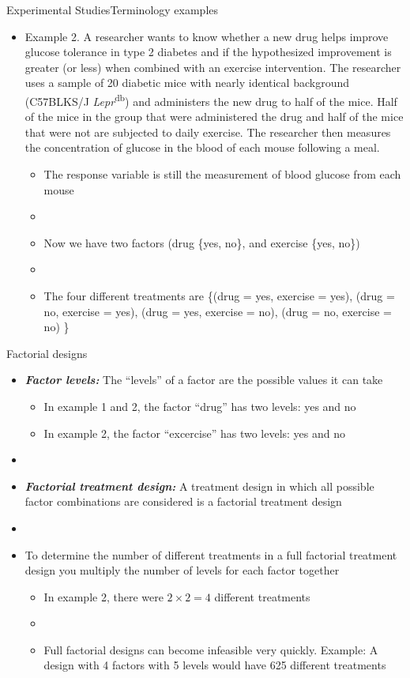 \documentclass[xcolor=dvipsnames]{beamer}
\begin{document}
\begin{frame}{Experimental Studies}{Terminology examples}
\begin{itemize}
	\item Example 2. A researcher wants to know whether a new drug helps improve glucose tolerance in type 2 diabetes and if the hypothesized improvement is greater (or less) when combined with an exercise intervention. The researcher uses a sample of 20 diabetic mice with nearly identical background (C57BLKS/J \emph{Lepr}\textsuperscript{db}) and administers the new drug to half of the mice. Half of the mice in the group that were administered the drug and half of the mice that were not are subjected to daily exercise. The researcher then measures the concentration of glucose in the blood of each mouse following a meal. 
	\begin{itemize}
		\item The response variable is still the measurement of blood glucose from each mouse
		\item[]
		\item Now we have two factors (drug \{yes, no\}, and exercise \{yes, no\})
		\item[]
		\item The four different treatments are \{(drug = yes, exercise = yes), (drug = no, exercise = yes), (drug = yes, exercise = no), (drug = no, exercise = no) \}
	\end{itemize}
\end{itemize}
\end{frame}

\begin{frame}{Factorial designs}
	\begin{itemize}
		\item \textbf{\emph{Factor levels:}} The ``levels'' of a factor are the possible values it can take
		\begin{itemize}
			\item In example 1 and 2, the factor ``drug'' has two levels: yes and no
			\item In example 2, the factor ``excercise'' has two levels: yes and no
		\end{itemize}
		\item[]
		\item \textbf{\emph{Factorial treatment design:}} A treatment design in which all possible factor combinations are considered is a factorial treatment design
		\item[]
		\item To determine the number of different treatments in a full factorial treatment design you multiply the number of levels for each factor together
		\begin{itemize}
			\item In example 2, there were $2 \times 2 = 4$ different treatments
			\item[]
			\item Full factorial designs can become infeasible very quickly. Example: A design with 4 factors with 5 levels would have 625 different treatments
		\end{itemize}		
	\end{itemize}
\end{frame}
\end{document}
